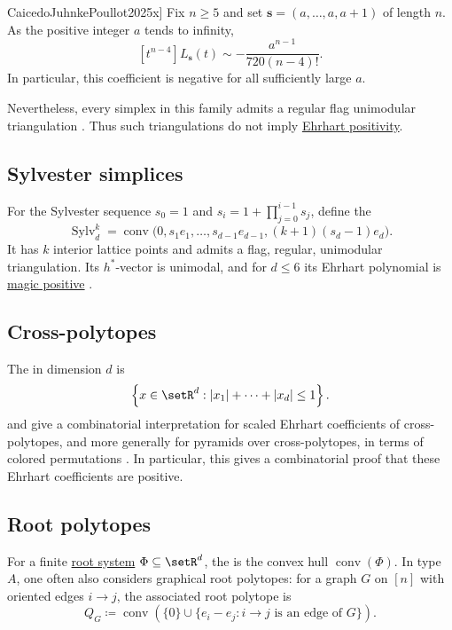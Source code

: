 \begin{theorem}[Caicedo--Juhnke--Poullot, \cite[Thm.~3.5]{CaicedoJuhnkePoullot2025x}]
Fix $n\geq5$ and set $\mathbf{s}=(a,\dotsc,a,a+1)$ of length $n$.
As the positive integer $a$ tends to infinity,
\[
 [t^{n-4}]L_{\mathbf{s}}(t)
 \sim -\frac{a^{n-1}}{720(n-4)!}.
\]
In particular, this coefficient is negative for all sufficiently large $a$.
\end{theorem}

Nevertheless, every simplex in this family admits a regular flag
unimodular triangulation \cite[Cor.~4.16]{CaicedoJuhnkePoullot2025x}.
Thus such triangulations do not imply
\hyperref[ehrhartConjecturalPositivity]{Ehrhart positivity}.

\subsection[sylvesterSimplex]{Sylvester simplices}

For the Sylvester sequence $s_0=1$ and
$s_i=1+\prod_{j=0}^{i-1}s_j$, define the 
\[
 \operatorname{Sylv}_d^k
 =\operatorname{conv}\bigl(
  0,s_1e_1,\dotsc,s_{d-1}e_{d-1},(k+1)(s_d-1)e_d
 \bigr).
\]
It has $k$ interior lattice points and admits a flag, regular, unimodular
triangulation.  Its $h^*$-vector is unimodal, and for $d\leq6$ its Ehrhart
polynomial is \hyperref[magicPositivePolynomial]{magic positive}
\cite[Thms.~3.5, 5.8 and Cor.~6.2]{CaicedoCastilloJuhnkePoullot2026x}.


\subsection[crossPolytope]{Cross-polytopes}

The \label{crossPolytopeDefinition}
in dimension $d$ is
\[
  \left\{ x\in\setR^d : |x_1|+\dotsb+|x_d|\leq 1 \right\}.
\]
 and  give a combinatorial
interpretation for scaled Ehrhart coefficients of cross-polytopes, and more
generally for pyramids over cross-polytopes, in terms of colored permutations
\cite{MenonVerkama2025x}.  In particular, this gives a combinatorial proof
that these Ehrhart coefficients are positive.


\subsection[rootPolytope]{Root polytopes}

For a finite \hyperref[rootSystem]{root system} $\Phi\subseteq\setR^d$, the
\label{rootPolytopeDefinition} is the convex hull
$\operatorname{conv}(\Phi)$.  In type
$A$, one often also considers graphical root polytopes: for a graph $G$ on
$[n]$ with oriented edges $i\to j$, the associated root polytope is
\[
  Q_G\coloneqq
  \operatorname{conv}\left(\{0\}\cup\{e_i-e_j : i\to j \text{ is an edge of }G\}\right).
\]


